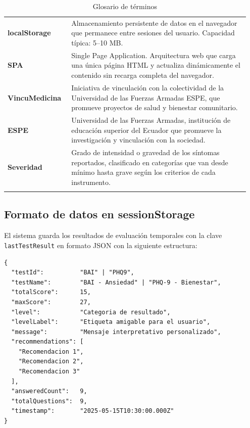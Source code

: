 \begin{longtable}{p{0.25\linewidth} p{0.70\linewidth}}
\textbf{localStorage}
  & Almacenamiento persistente de datos en el navegador que permanece entre sesiones del usuario. Capacidad típica: 5--10 MB. \\
\textbf{SPA}
  & Single Page Application. Arquitectura web que carga una única página HTML y actualiza dinámicamente el contenido sin recarga completa del navegador. \\
\textbf{VincuMedicina}
  & Iniciativa de vinculación con la colectividad de la Universidad de las Fuerzas Armadas ESPE, que promueve proyectos de salud y bienestar comunitario. \\
\textbf{ESPE}
  & Universidad de las Fuerzas Armadas, institución de educación superior del Ecuador que promueve la investigación y vinculación con la sociedad. \\
\textbf{Severidad}
  & Grado de intensidad o gravedad de los síntomas reportados, clasificado en categorías que van desde mínimo hasta grave según los criterios de cada instrumento. \\
\bottomrule
\caption{Glosario de términos}
\label{tab:glosario}
\end{longtable}

\subsection{Formato de datos en sessionStorage}
\label{sec:formato_datos}

El sistema guarda los resultados de evaluación temporales con la clave \texttt{lastTestResult} en formato JSON con la siguiente estructura:

\begin{lstlisting}[caption={Estructura de datos en sessionStorage},
                   label=lst:sessionstorage]
{
  "testId":          "BAI" | "PHQ9",
  "testName":        "BAI - Ansiedad" | "PHQ-9 - Bienestar",
  "totalScore":      15,
  "maxScore":        27,
  "level":           "Categoria de resultado",
  "levelLabel":      "Etiqueta amigable para el usuario",
  "message":         "Mensaje interpretativo personalizado",
  "recommendations": [
    "Recomendacion 1",
    "Recomendacion 2",
    "Recomendacion 3"
  ],
  "answeredCount":   9,
  "totalQuestions":  9,
  "timestamp":       "2025-05-15T10:30:00.000Z"
}
\end{lstlisting}


